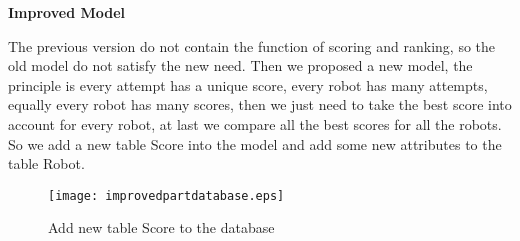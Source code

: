 \item{\textbf{Improved Model}}

The previous version do not contain the function of scoring and ranking, so the old model do not satisfy the new need. Then we proposed a new model, the principle is every attempt has a unique score, every robot has many attempts, equally every robot has many scores, then we just need to take the best score into account for every robot, at last we compare all the best scores for all the robots. So we add a new table Score into the model and add some new attributes to the table Robot.
\begin{figure}[h!]
\centering
\texttt{[image: improvedpartdatabase.eps]}
\caption{Add new table Score to the database}
\label{fig-sample}
\end{figure}